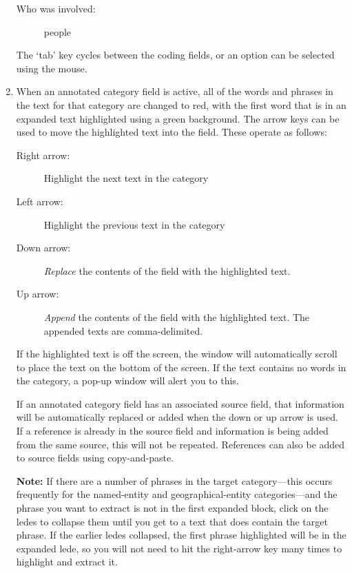 \documentclass[letterpaper,10pt,english]{sphinxmanual}
\begin{document}
\begin{enumerate}
\begin{description}
\item[{Who was involved:}] \leavevmode
people

\end{description}

The ‘tab’ key cycles between the coding fields, or an option can be
selected using the mouse.

\item {} 
When an annotated category field is active, all of the words and
phrases in the text for that category are changed to red, with the
first word that is in an expanded text highlighted using a green
background. The arrow keys can
be used to move the highlighted text into the field. These operate as
follows:
\begin{description}
\item[{Right arrow:}] \leavevmode
Highlight the next text in the category

\item[{Left arrow:}] \leavevmode
Highlight the previous text in the category

\item[{Down arrow:}] \leavevmode
\emph{Replace} the contents of the field with the highlighted
text.

\item[{Up arrow:}] \leavevmode
\emph{Append} the contents of the field with the highlighted text.
The appended texts are comma-delimited.

\end{description}

If the highlighted text is off the screen, the window will automatically
scroll to place the text on the bottom of the screen. If the text
contains no words in the category, a pop-up window will alert you
to this.

If an annotated category field has an associated source field, that
information will be automatically replaced or added when the down
or up arrow is used. If a reference is already in the source field
and information is being added from the same source, this will not
be repeated. References can also be added to source fields using
copy-and-paste.

\textbf{Note:} If there are a number of phrases in the target category—this occurs
frequently for the named-entity and geographical-entity categories—and
the phrase you want to extract is not in the first
expanded block, click on the ledes to collapse them until you get
to a text that does contain the target phrase. If the earlier ledes
collapsed, the first phrase highlighted will be in the expanded
lede, so you will not need to hit the right-arrow key many times
to highlight and extract it.


\end{enumerate}
\end{document}
